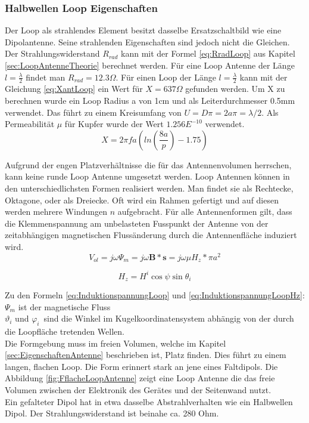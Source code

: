 \subsubsection{Halbwellen Loop Eigenschaften}
Der Loop als strahlendes Element besitzt dasselbe Ersatzschaltbild wie eine Dipolantenne. Seine strahlenden Eigenschaften sind jedoch nicht die Gleichen. Der Strahlungswiderstand $R_{rad}$ kann mit der Formel \ref{eq:RradLoop} aus Kapitel \ref{sec:LoopAntenneTheorie} berechnet werden. Für eine Loop Antenne der Länge $l=\frac{\lambda}{2}$ findet man $R_{rad} = 12.3\Omega$. Für einen Loop der Länge $l=\frac{\lambda}{2}$ kann mit der Gleichung \ref{eq:XantLoop} ein Wert für $X = 637 \Omega$ gefunden werden. Um X zu berechnen wurde ein Loop Radius a von 1cm und als Leiterdurchmesser 0.5mm verwendet. Das führt zu einem Kreisumfang von $U=D\pi=2a\pi=\lambda /2$. Als Permeabilität $\mu $ für Kupfer wurde der Wert $1.256E^{-10}$ verwendet.
\begin{equation}\label{eq:XantLoop}
X= 2\pi f a(ln \left( \frac{8a}{p} \right) - 1.75)
\end{equation}

Aufgrund der engen Platzverhältnisse die für das Antennenvolumen herrschen, kann keine runde Loop Antenne umgesetzt werden. Loop Antennen können in den unterschiedlichsten Formen realisiert werden. Man findet sie als Rechtecke, Oktagone, oder als Dreiecke. Oft wird ein Rahmen gefertigt und auf diesen  werden mehrere Windungen $n$ aufgebracht. Für alle Antennenformen gilt, dass die Klemmenspannung am unbelasteten Fusspunkt der Antenne von der zeitabhängigen magnetischen Flussänderung durch die Antennenfläche induziert wird.
\begin{equation}\label{eq:InduktionspannungLoop}
V_{ol}= j\omega\Psi_{m}=j\omega\textbf{B}*\textbf{s}= j\omega\mu H_{z}*\pi a^{2}
\end{equation}

\begin{equation}\label{eq:InduktionspannungLoopHz}
H_{z}=H^{i}\cos\psi\sin\theta_{i}
\end{equation}

Zu den Formeln \ref{eq:InduktionspannungLoop} und \ref{eq:InduktionspannungLoopHz}: \\
$\Psi_{m}$ ist der magnetische Fluss\\
$\vartheta_{i}$ und $\varphi_{i}$\  sind die Winkel im Kugelkoordinatensystem abhängig von der durch die Loopfläche tretenden Wellen.
 \\ 
Die Formgebung muss im freien Volumen, welche im Kapitel \ref{sec:EigenschaftenAntenne} beschrieben ist, Platz finden. Dies führt zu einem langen, flachen Loop. Die Form erinnert stark an jene eines Faltdipols. Die Abbildung \ref{fig:FflacheLoopAntenne} zeigt eine Loop Antenne die das freie Volumen zwischen der Elektronik des Gerätes und der Seitenwand nutzt.\\
Ein gefalteter Dipol hat in etwa dasselbe Abstrahlverhalten wie ein Halbwellen Dipol. Der Strahlungswiderstand ist beinahe  ca.  280 Ohm. 


